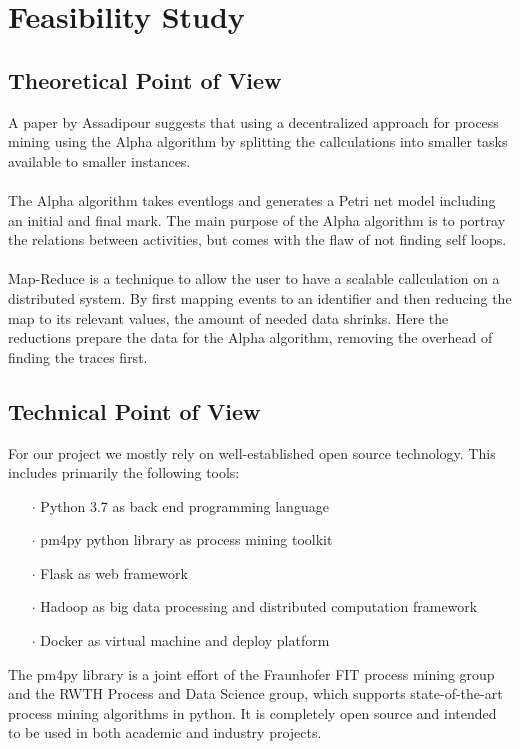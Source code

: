 \documentclass[runningheads]{llncs}
\begin{document}
\section{Feasibility Study}

\subsection{Theoretical Point of View}
A paper by Assadipour\cite{mapReduce} suggests that using a decentralized approach for process mining using the Alpha algorithm by splitting the callculations into smaller tasks available to smaller instances. \\ \ \\
The Alpha algorithm takes eventlogs and generates a Petri net model including an initial and final mark. The main purpose of the Alpha algorithm is to portray the relations between activities, but comes with the flaw of not finding self loops.  \\ \ \\
Map-Reduce is a technique to allow the user to have a scalable callculation on a distributed system. By first mapping events to an identifier and then reducing the map to its relevant values, the amount of needed data shrinks. Here the reductions prepare the data for the Alpha algorithm, removing the overhead of finding the traces first.
\subsection{Technical Point of View}
For our project we mostly rely on well-established open source technology. This includes primarily the following tools:\\


\begin{itemize}
	\item[\Large $\cdot$]   Python 3.7 as back end programming language
	\item[\Large $\cdot$]   pm4py python library as process mining toolkit
	\item[\Large $\cdot$]   Flask as web framework
	\item[\Large $\cdot$]   Hadoop as big data processing and distributed computation framework
	\item[\Large $\cdot$]   Docker as virtual machine and deploy platform
\end{itemize}

\noindent
The pm4py library is a joint effort of the Fraunhofer FIT process mining group and the RWTH Process and Data Science group, which supports state-of-the-art process mining algorithms in python. It is completely open source and intended to be used in both academic and industry projects.\\
\end{document}
